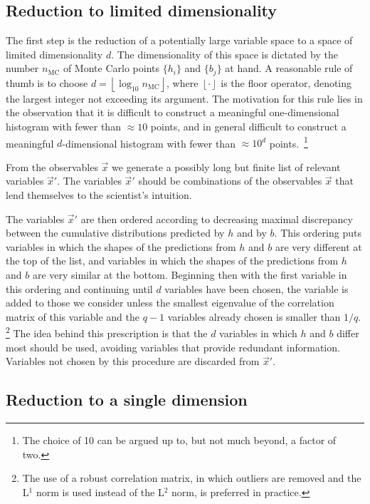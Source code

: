 \documentclass[twocolumn,twoside,prd]{revtex4} %
\newcommand {\footnoteIgnore}[1]{\footnote{#1}}
\newcommand {\footnoteParenthetical}[1]{\footnote{#1}}
\newcommand {\floor}[1]{\left\lfloor #1 \right\rfloor}
\begin{document}
\subsection{Reduction to limited dimensionality}

The first step is the reduction of a potentially large variable space to a space of limited dimensionality $d$.  The dimensionality of this space is dictated by the number $n_\text{MC}$ of Monte Carlo points $\{ h_i \}$ and $\{ b_j \}$ at hand.  A reasonable rule of thumb is to choose $d = \floor{\log_{10}{n_\text{MC}}}$, where $\floor{\cdot}$ is the floor operator, denoting the largest integer not exceeding its argument.  The motivation for this rule lies in the observation that it is difficult to construct a meaningful one-dimensional histogram with fewer than $\approx 10$ points, and in general difficult to construct a meaningful $d$-dimensional histogram with fewer than $\approx 10^d$ points.~\footnoteParenthetical{The choice of 10 can be argued up to, but not much beyond, a factor of two.}

From the observables $\vec{x}$ we generate a possibly long but finite list of relevant variables $\vec{x}'$.  The variables $\vec{x}'$ should be combinations of the observables $\vec{x}$ that lend themselves to the scientist's intuition.

The variables $\vec{x}'$ are then ordered according to decreasing maximal discrepancy between the cumulative distributions predicted by $h$ and by $b$.  This ordering puts variables in which the shapes of the predictions from $h$ and $b$ are very different at the top of the list, and variables in which the shapes of the predictions from $h$ and $b$ are very similar at the bottom.  Beginning then with the first variable in this ordering and continuing until $d$ variables have been chosen, the variable is added to those we consider unless the smallest eigenvalue of the correlation matrix of this variable and the $q-1$ variables already chosen is smaller than $1/q$. \footnoteIgnore{The use of a robust correlation matrix, in which outliers are removed and the L$^1$ norm is used instead of the L$^2$ norm, is preferred in practice.} The idea behind this prescription is that the $d$ variables in which $h$ and $b$ differ most should be used, avoiding variables that provide redundant information.  Variables not chosen by this procedure are discarded from $\vec{x}'$.

\subsection{Reduction to a single dimension}
\end{document}
